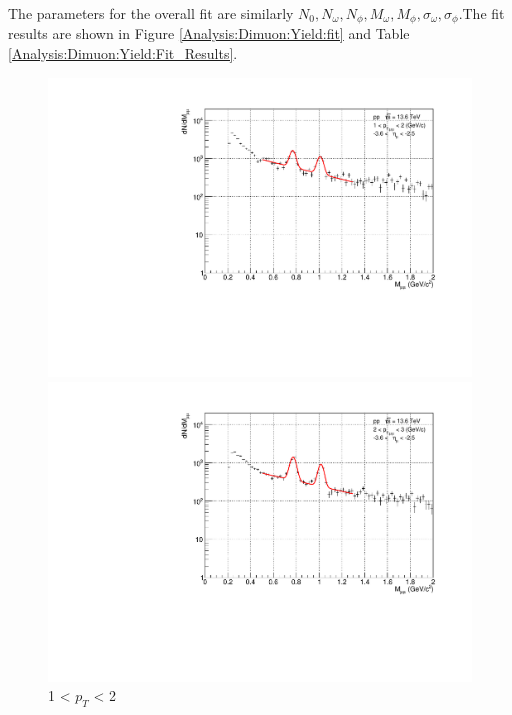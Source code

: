                 The parameters for the overall fit are similarly \(N_0, N_{\omega}, N_{\phi}, M_{\omega}, M_{\phi}, \sigma_{\omega}, \sigma_{\phi}\).\@ The fit results are shown in Figure \ref{Analysis:Dimuon:Yield:fit} and Table \ref{Analysis:Dimuon:Yield:Fit_Results}.
                \begin{figure}[H]
                    \centering
                    \begin{minipage}{0.45\textwidth}
                        \centering
                        \includegraphics[width=\textwidth]{fig/3_4_2_fit_pt_1to2.pdf}
                        \captionsetup{labelformat=empty}
                        \caption*{1 < $p_{T}$ < 2}
                    \end{minipage}
                    \hfill
                    \begin{minipage}{0.45\textwidth}
                        \centering
                        \includegraphics[width=\textwidth]{fig/3_4_2_fit_pt_2to3.pdf}

\end{minipage}
\end{figure}
